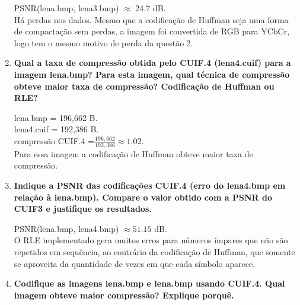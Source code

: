 \documentclass[12pt, a4paper, oneside]{abntex2}
\begin{document}
\begin{enumerate}
        PSNR(lena.bmp, lena3.bmp) $\approx$ 24.7 dB. \\
        Há perdas nos dados.
        Mesmo que a codificação de Huffman seja uma forma de compactação sem perdas, a imagem foi convertida de RGB para YCbCr, logo tem o mesmo motivo de perda da questão 2.

        \item \textbf{Qual a taxa de compressão obtida pelo CUIF.4 (lena4.cuif) para a imagem lena.bmp?
        Para esta imagem, qual técnica de compressão obteve maior taxa de compressão?
        Codificação de Huffman ou RLE?}

        lena.bmp = 196,662 B. \\
        lena4.cuif = 192,386 B. \\
        compressão CUIF.4 =$\frac{196,662}{192,386} \approx 1.02$. \\
        Para essa imagem a codificação de Huffman obteve maior taxa de compressão.

        \item \textbf{Indique a PSNR das codificações CUIF.4 (erro do lena4.bmp em relação à lena.bmp). Compare o valor obtido com a PSNR do CUIF3 e justifique os resultados.}

        PSNR(lena.bmp, lena4.bmp) $\approx 51.15$ dB. \\
        O RLE implementado gera muitos erros para números ímpares que não são repetidos em sequência, ao contrário da codificação de Huffman, que somente se aproveita da quantidade de vezes em que cada símbolo aparece.

        \item \textbf{Codifique as imagens lena.bmp e lena.bmp usando CUIF.4. Qual imagem obteve maior compressão?
        Explique porquê.}


    \end{enumerate}
\end{document}
